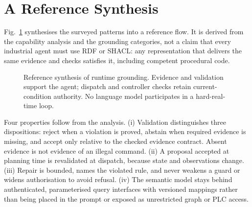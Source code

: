\section{A Reference Synthesis}
\label{sec:architecture}

Fig.~\ref{fig:runtime} synthesises the surveyed patterns into a reference flow. It is
derived from the capability analysis and the grounding categories, not a claim that every
industrial agent must use RDF or SHACL: any representation that delivers the same evidence
and checks satisfies it, including competent procedural code.

\begin{figure}[t]
\centering
{}
\caption{Reference synthesis of runtime grounding. Evidence and validation support the agent;
dispatch and controller checks retain current-condition authority. No language model
participates in a hard-real-time loop.}
\label{fig:runtime}
\end{figure}

Four properties follow from the analysis. (i) Validation distinguishes three dispositions:
reject when a violation is proved, abstain when required evidence is missing, and accept
only relative to the checked evidence contract. Absent evidence is not evidence of an
illegal command. (ii) A proposal accepted at planning time is revalidated at dispatch,
because state and observations change. (iii) Repair is bounded, names the violated rule,
and never weakens a guard or widens authorisation to avoid refusal. (iv) The semantic model
stays behind authenticated, parameterised query interfaces with versioned mappings rather
than being placed in the prompt or exposed as unrestricted graph or PLC access.
